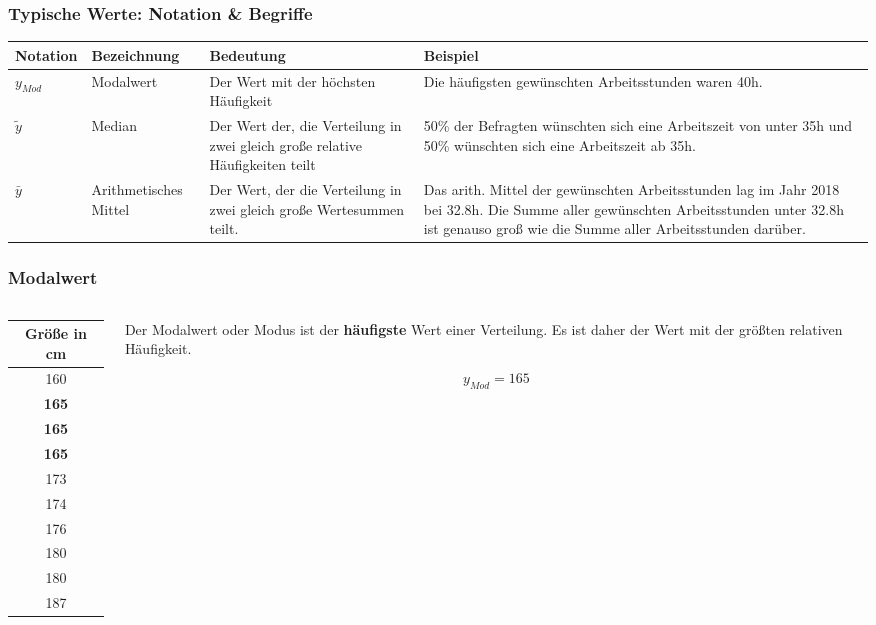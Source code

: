 \begin{frame}
  \frametitle{Typische Werte: Notation \& Begriffe}
\small
\begin{tabular}{lp{.12\linewidth}p{.3\linewidth}p{.4\linewidth}} \toprule 
Notation & Bezeichnung & Bedeutung & Beispiel\\ \midrule
$y_{Mod} $ & Modalwert & Der Wert mit der höchsten Häufigkeit & Die häufigsten gewünschten Arbeitsstunden waren 40h. \\[.5em]
$\tilde{y}$ & Median & Der Wert der, die Verteilung in zwei gleich große relative Häufigkeiten teilt & 50\% der Befragten wünschten sich eine Arbeitszeit von unter 35h und 50\% wünschten sich eine Arbeitszeit ab 35h.\\[.5em]
$\bar{y}$ & Arith\-metisches Mittel & Der Wert, der die Verteilung in zwei gleich große Wertesummen teilt. & Das arith. Mittel der gewünschten Arbeitsstunden lag im Jahr 2018 bei 32.8h. Die Summe aller gewünschten Arbeitsstunden unter 32.8h ist genauso groß wie die Summe aller Arbeitsstunden darüber.\\
 \bottomrule
\end{tabular}
  
\end{frame}
\begin{frame}
\frametitle{Modalwert}
\begin{columns}
\begin{column}{.5\linewidth}
\begin{center}
\begin{tabular}{c} \\ \toprule
Größe in cm\\ \midrule
160\\
\textbf{165}\\
\textbf{165}\\
\textbf{165}\\
 173\\ 
 174\\
 176\\
 180\\
 180\\
 187\\ \bottomrule
\end{tabular}
\end{center}
\quad \newline 
\end{column}
\begin{column}[b]{.5\linewidth}
Der Modalwert oder Modus ist der \textbf{häufigste} Wert einer Verteilung. Es ist daher der Wert mit der größten relativen Häufigkeit. 

\[
y_{Mod} = 165  \nonumber 
\]
\end{column}
\end{columns}
\quad \newline 
\end{frame}

